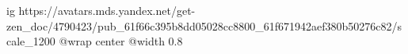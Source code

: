  
 
 
 
 

\ifcmt
  ig https://avatars.mds.yandex.net/get-zen_doc/4790423/pub_61f66c395b8dd05028cc8800_61f671942aef380b50276c82/scale_1200
  @wrap center
  @width 0.8
\fi
